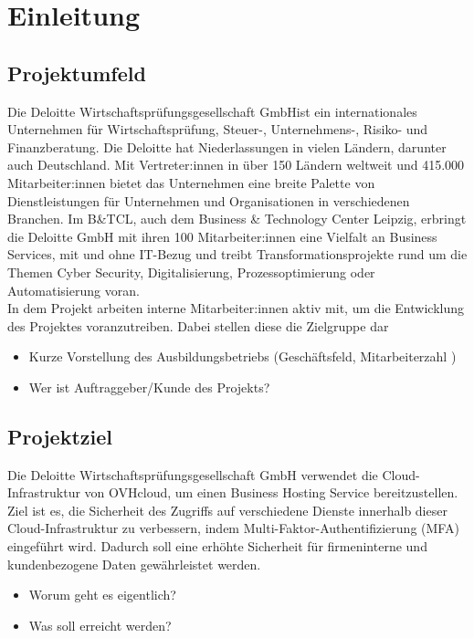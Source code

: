 \section{Einleitung}
\label{sec:Einleitung}


\subsection{Projektumfeld} 
\label{sec:Projektumfeld}
Die Deloitte Wirtschaftsprüfungsgesellschaft GmbHist ein internationales 
Unternehmen für Wirtschaftsprüfung, Steuer-, Unternehmens-, Risiko- und Finanzberatung. 
Die Deloitte hat Niederlassungen in vielen Ländern, darunter auch Deutschland. 
Mit Vertreter:innen in über 150 Ländern weltweit und 415.000 Mitarbeiter:innen bietet das Unternehmen eine breite Palette von Dienstleistungen für Unternehmen und Organisationen in verschiedenen Branchen.
Im B\&TCL, auch dem Business \& Technology Center Leipzig, erbringt die Deloitte
GmbH mit ihren 100 Mitarbeiter:innen eine Vielfalt an Business Services, mit und ohne IT-Bezug und treibt
Transformationsprojekte rund um die Themen Cyber Security, Digitalisierung,
Prozessoptimierung oder Automatisierung voran.
\\In dem Projekt arbeiten interne Mitarbeiter:innen aktiv mit, um die Entwicklung des
Projektes voranzutreiben. Dabei stellen diese die Zielgruppe dar
\begin{itemize}
    \item Kurze Vorstellung des Ausbildungsbetriebs (Geschäftsfeld, Mitarbeiterzahl \usw)
	\item Wer ist Auftraggeber/Kunde des Projekts?
\end{itemize}


\subsection{Projektziel} 
\label{sec:Projektziel}
Die Deloitte Wirtschaftsprüfungsgesellschaft GmbH verwendet die Cloud-Infrastruktur
von OVHcloud, um einen Business Hosting Service bereitzustellen.
\\Ziel ist es, die Sicherheit des Zugriffs auf verschiedene Dienste 
innerhalb dieser Cloud-Infrastruktur zu verbessern, indem 
Multi-Faktor-Authentifizierung (MFA) eingeführt wird. 
Dadurch soll eine erhöhte Sicherheit für firmeninterne und kundenbezogene 
Daten gewährleistet werden.
\begin{itemize}
	\item Worum geht es eigentlich?
	\item Was soll erreicht werden?
\end{itemize}


